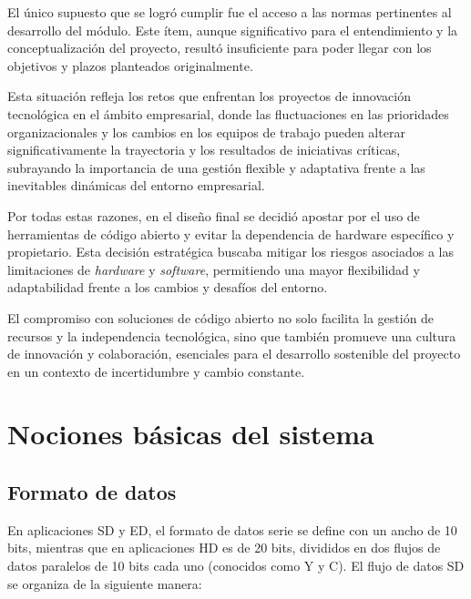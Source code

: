   El único supuesto que se logró cumplir fue el acceso a las normas pertinentes
  al desarrollo del módulo. Este ítem, aunque significativo para el entendimiento
  y la conceptualización del proyecto, resultó insuficiente para poder llegar
  con los objetivos y plazos planteados originalmente.
  

  Esta situación refleja los retos que enfrentan los proyectos de innovación
  tecnológica en el ámbito empresarial, donde las fluctuaciones en las prioridades
  organizacionales y los cambios en los equipos de trabajo pueden alterar
  significativamente la trayectoria y los resultados de iniciativas críticas,
  subrayando la importancia de una gestión flexible y adaptativa frente a las
  inevitables dinámicas del entorno empresarial.

  Por todas estas razones, en el diseño final se decidió apostar por el uso de
  herramientas de código abierto y evitar la dependencia de hardware específico y
  propietario. Esta decisión estratégica buscaba mitigar los riesgos asociados a
  las limitaciones de \textit{hardware} y \textit{software}, permitiendo una
  mayor flexibilidad y adaptabilidad frente a los cambios y desafíos del entorno.

  El compromiso con soluciones de código abierto no solo facilita la gestión de
  recursos y la independencia tecnológica, sino que también promueve una cultura
  de innovación y colaboración, esenciales para el desarrollo sostenible del
  proyecto en un contexto de incertidumbre y cambio constante.

\section{Nociones básicas del sistema}

  \subsection{Formato de datos}

  En aplicaciones SD y ED, el formato de datos serie se define con un ancho de 10 bits,
  mientras que en aplicaciones HD es de 20 bits, divididos en dos flujos de datos paralelos
  de 10 bits cada uno (conocidos como Y y C). El flujo de datos SD se organiza de la
  siguiente manera:

